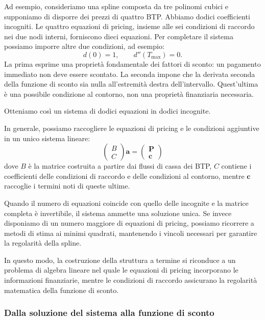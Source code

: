 Ad esempio, consideriamo una spline composta da tre polinomi cubici e supponiamo di disporre dei prezzi di quattro BTP. Abbiamo dodici coefficienti incogniti. Le quattro equazioni di pricing, insieme alle sei condizioni di raccordo nei due nodi interni, forniscono dieci equazioni. Per completare il sistema possiamo imporre altre due condizioni, ad esempio:
\[
d(0)=1,\qquad d''(T_{\max})=0.
\]
La prima esprime una proprietà fondamentale dei fattori di sconto: un pagamento immediato non deve essere scontato. La seconda impone che la derivata seconda della funzione di sconto sia nulla all'estremità destra dell'intervallo. Quest'ultima è una possibile condizione al contorno, non una proprietà finanziaria necessaria.

Otteniamo così un sistema di dodici equazioni in dodici incognite.

In generale, possiamo raccogliere le equazioni di pricing e le condizioni aggiuntive in un unico sistema lineare:
\[
\boxed{
\begin{pmatrix}
B\\ C
\end{pmatrix}
\mathbf a=
\begin{pmatrix}
\mathbf P\\ \mathbf c
\end{pmatrix}
}
\]
dove $B$ è la matrice costruita a partire dai flussi di cassa dei BTP, $C$ contiene i coefficienti delle condizioni di raccordo e delle condizioni al contorno, mentre $\mathbf c$ raccoglie i termini noti di queste ultime.

Quando il numero di equazioni coincide con quello delle incognite e la matrice completa è invertibile, il sistema ammette una soluzione unica. Se invece disponiamo di un numero maggiore di equazioni di pricing, possiamo ricorrere a metodi di stima ai minimi quadrati, mantenendo i vincoli necessari per garantire la regolarità della spline.

In questo modo, la costruzione della struttura a termine si riconduce a un problema di algebra lineare nel quale le equazioni di pricing incorporano le informazioni finanziarie, mentre le condizioni di raccordo assicurano la regolarità matematica della funzione di sconto.




\subsubsection{Dalla soluzione del sistema alla funzione di sconto}

